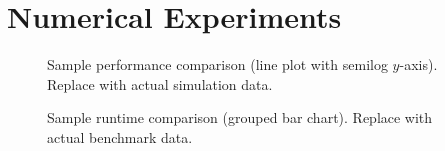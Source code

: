 
\section{Numerical Experiments}\label{sec:numerical_experiments}


\begin{figure}[t]
  \centering
  
  \caption{Sample performance comparison (line plot with semilog $y$-axis).
    Replace with actual simulation data.}
  \label{fig:sample_line_plot}
\end{figure}

\begin{figure}[t]
  \centering
  
  \caption{Sample runtime comparison (grouped bar chart).
    Replace with actual benchmark data.}
  \label{fig:sample_bar_chart}
\end{figure}
